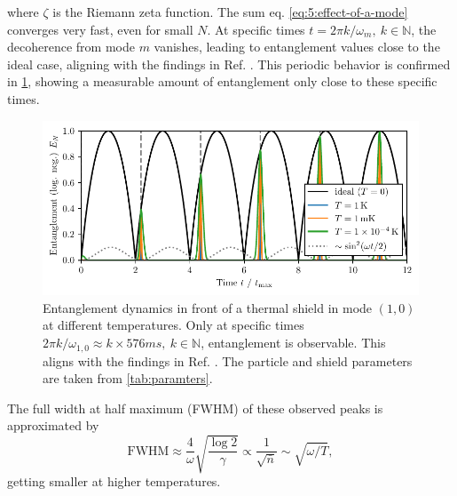 where $\zeta$ is the Riemann zeta function. The sum eq. \eqref{eq:5:effect-of-a-mode} converges very fast, even for small $N$.
At specific times $t=2\pi k/\omega_m, \ k\in\mathbb{N}$, the decoherence from mode $m$ vanishes, leading to entanglement values close to the ideal case, aligning with the findings in Ref. \cite{Pedernales_2022}.
This periodic behavior is confirmed in \cref{fig:5:entanglement-time-single-mode}, showing a measurable amount of entanglement only close to these specific times.
\begin{figure}[!htbp]
  \centering
  \includegraphics[width=\textwidth]{./../figures/vibrations/entanglement-hamiltonian.pdf}
  \caption{Entanglement dynamics in front of a thermal shield in mode $(1,0)$ at different temperatures. Only at specific times $2\pi k / \omega_{1,0} \approx k\times 576\si{ms},\ k\in\mathbb{N}$, entanglement is observable. This aligns with the findings in Ref. \cite{Pedernales_2022}. The particle and shield parameters are taken from \cref{tab:paramters}.}
  \label{fig:5:entanglement-time-single-mode}
\end{figure}
The full width at half maximum (FWHM) of these observed peaks is approximated by
\begin{equation}
  \mathrm{FWHM} \approx \frac{4}{\omega}\sqrt{\frac{\log 2}{\gamma}} \propto \frac{1}{\sqrt{\bar{n}}} \sim \sqrt{\omega/T},
\end{equation}
getting smaller at higher temperatures.

